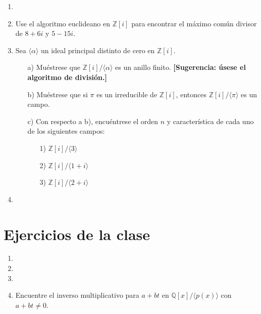 \documentclass[12pt]{article}
\theoremstyle{definition}
\theoremstyle{remark}
\begin{document}
\begin{enumerate}
    \item  
    
    \item Use el algoritmo euclideano en $\mathbb{Z}[i]$ para encontrar el máximo común divisor de $8 + 6i$ y $5 - 15i$.

    \item Sea $\langle \alpha \rangle$ un ideal principal distinto de cero en $\mathbb{Z}[i]$.
    
    \begin{enumerate}
        \item[a)] Muéstrese que $\mathbb{Z}[i]/\langle \alpha \rangle$ es un anillo finito. \textbf{[Sugerencia: úsese el algoritmo de división.]}
        
        \item[b)] Muéstrese que si $\pi$ es un irreducible de $\mathbb{Z}[i]$, entonces $\mathbb{Z}[i]/\langle \pi \rangle$ es un campo.
        
        \item[c)] Con respecto a b), encuéntrese el orden $n$ y característica de cada uno de los siguientes campos:
        
        \begin{enumerate}
            \item[1)] $\mathbb{Z}[i]/\langle 3 \rangle$
            \item[2)] $\mathbb{Z}[i]/\langle 1 + i \rangle$
            \item[3)] $\mathbb{Z}[i]/\langle 2 + i \rangle$
        \end{enumerate}
    \end{enumerate}

    \item 
\end{enumerate}


\section*{Ejercicios de la clase}
\begin{enumerate}
    \item 
    \item 
    \item 
    \item Encuentre el inverso multiplicativo para \( a + b t \) en \( \mathbb{Q}[x] / \langle p(x) \rangle \) con \( a + b t \neq 0 \).

\end{enumerate}
\end{document}
